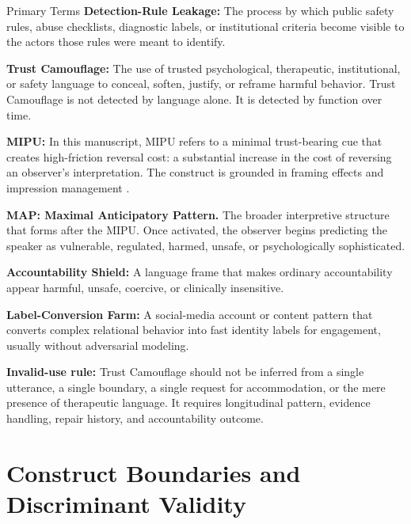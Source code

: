 \documentclass[11pt, letterpaper]{article}
\newcommand{\term}[1]{\textbf{#1}}
\begin{document}
\begin{frameworkbox}{Primary Terms}
\small
\term{Detection-Rule Leakage:} The process by which public safety rules, abuse checklists, diagnostic labels, or institutional criteria become visible to the actors those rules were meant to identify.

\vspace{0.25em}
\term{Trust Camouflage:} The use of trusted psychological, therapeutic, institutional, or safety language to conceal, soften, justify, or reframe harmful behavior. Trust Camouflage is not detected by language alone. It is detected by function over time.

\vspace{0.25em}
\term{MIPU:} In this manuscript, MIPU refers to a minimal trust-bearing cue that creates high-friction reversal cost: a substantial increase in the cost of reversing an observer's interpretation. The construct is grounded in framing effects \cite{TverskyKahneman1981} and impression management \cite{Goffman1959}.

\vspace{0.25em}
\term{MAP: Maximal Anticipatory Pattern.} The broader interpretive structure that forms after the MIPU. Once activated, the observer begins predicting the speaker as vulnerable, regulated, harmed, unsafe, or psychologically sophisticated.

\vspace{0.25em}
\term{Accountability Shield:} A language frame that makes ordinary accountability appear harmful, unsafe, coercive, or clinically insensitive.

\vspace{0.25em}
\term{Label-Conversion Farm:} A social-media account or content pattern that converts complex relational behavior into fast identity labels for engagement, usually without adversarial modeling.
\end{frameworkbox}

\term{Invalid-use rule:} Trust Camouflage should not be inferred from a single utterance, a single boundary, a single request for accommodation, or the mere presence of therapeutic language. It requires longitudinal pattern, evidence handling, repair history, and accountability outcome.

\section{Construct Boundaries and Discriminant Validity}
\end{document}
